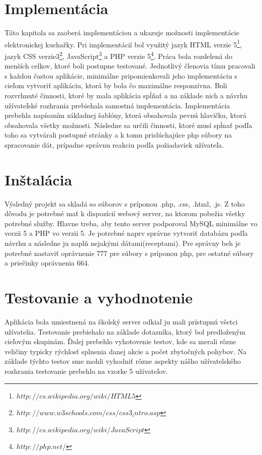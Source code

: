 \documentclass[12pt,a4paper,titlepage,final]{article}
\begin{document}
\section{Implementácia}
Táto kapitola sa zaoberá implementáciou a ukazuje možnosti implementácie elektronickej kuchařky. Pri implementácií bol využitý jazyk HTML verzie 5\footnote{$http://cs.wikipedia.org/wiki/HTML5$}, jazyk CSS verzie3\footnote{$http://www.w3schools.com/css/css3_intro.asp$}, JavaScript\footnote{$http://cs.wikipedia.org/wiki/JavaScript$} a PHP verzie 5\footnote{$http://php.net/$}. Práca bola rozdelená do menších celkov, ktoré boli postupne testované. Jednotlivý členovia tímu pracovali s každou častou aplikácie, minimálne pripomienkovali jeho implementáciu s cieľom vytvoriť aplikáciu, ktorá by bola čo maximálne responzívna. Boli rozvrhnuté činnosti, ktoré by mala aplikácia spĺňať a na základe nich a návrhu užívateľské rozhrania prebiehala samostná implementácia. Implementácia prebehla napísaním základnej šablóny, ktorá obsahovala pevnú hlavičku, ktorá obsahovala všetky možnosti. Následne sa určili činnosti, ktoré musí spĺnať podľa toho sa vytvárali postupné stránky a k tomu prislúchajúce php súbory na spracovanie dát, prípadne správnu reakciu podľa požiadaviek užívateľa.\cite{Prokop:Algoritmy}


\section{Inštalácia}
Výsledný projekt sa skladá so súborov s príponou .php, .css, .html, .js. Z toho dôvodu je potrebné mať k dispozícií webový server, na ktorom pobežia všetky potrebné služby. Hlavne treba, aby tento server podporoval MySQL minimálne vo verzii 5 a PHP vo verzii 5. Je potrebné naprv správne vytvoriť databázu podľa návrhu a následne ju naplň nejakými dátami(receptami). Pre správny beh je potrebné nastaviť oprávnenie 777 pre súbory s príponou php, pre ostatné súbory a priečinky oprávnenia 664.

\section{Testovanie a vyhodnotenie}
Aplikácia bola umiestnená na školský server odkiaľ ju mali prístupnú všetci užívatelia. Testovanie prebiehalo na základe dotazníka, ktorý bol predloženým cieľovým skupinám. Ďalej prebehlo vyhotovenie testov, kde sa merali rôzne veličiny typicky rýchlosť splnenia danej akcie a počet zbytočných pohybov. Na základe týchto testov sme mohli vyhodniť rôzne aspekty nášho užívatelského rozhrania testovanie prebehlo na vzorke 5 užívateľov. 
\end{document}
